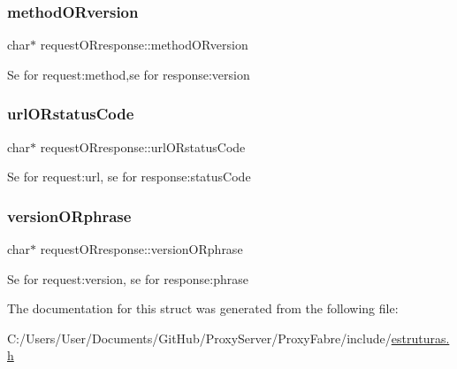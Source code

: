 \subsubsection{\texorpdfstring{method\+O\+Rversion}{methodORversion}}
{\footnotesize\ttfamily char$\ast$ request\+O\+Rresponse\+::method\+O\+Rversion}

Se for request\+:method,se for response\+:version \mbox{\label{structrequest_o_rresponse_a4c5ea7fd41d03df0551e6a106da90e53}} 
\subsubsection{\texorpdfstring{url\+O\+Rstatus\+Code}{urlORstatusCode}}
{\footnotesize\ttfamily char$\ast$ request\+O\+Rresponse\+::url\+O\+Rstatus\+Code}

Se for request\+:url, se for response\+:status\+Code \mbox{\label{structrequest_o_rresponse_a90f496e16fb4077741e610edd1ba0185}} 
\subsubsection{\texorpdfstring{version\+O\+Rphrase}{versionORphrase}}
{\footnotesize\ttfamily char$\ast$ request\+O\+Rresponse\+::version\+O\+Rphrase}

Se for request\+:version, se for response\+:phrase 

The documentation for this struct was generated from the following file\+:\begin{DoxyCompactItemize}
\item 
C\+:/\+Users/\+User/\+Documents/\+Git\+Hub/\+Proxy\+Server/\+Proxy\+Fabre/include/\hyperlink{estruturas_8h}{estruturas.\+h}\end{DoxyCompactItemize}
